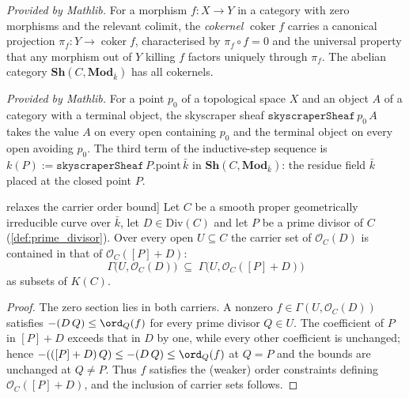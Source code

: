 \begin{definition}
  \label{def:cokernel_mathlib}
  \mathlibok
  \textit{Provided by Mathlib.}
  For a morphism \(f : X \to Y\) in a category with zero morphisms and the
  relevant colimit, the \emph{cokernel} \(\operatorname{coker} f\) carries a
  canonical projection \(\pi_f : Y \to \operatorname{coker} f\), characterised
  by \(\pi_f \circ f = 0\) and the universal property that any morphism out of
  \(Y\) killing \(f\) factors uniquely through \(\pi_f\). The abelian category
  \(\mathbf{Sh}(C, \mathbf{Mod}_{\bar k})\) has all cokernels.
\end{definition}

\begin{definition}
  \label{def:skyscraperSheaf_mathlib}
  \mathlibok
  \textit{Provided by Mathlib.}
  For a point \(p_0\) of a topological space \(X\) and an object \(A\) of a
  category with a terminal object, the skyscraper sheaf
  \(\texttt{skyscraperSheaf}\,p_0\,A\) takes the value \(A\) on every open
  containing \(p_0\) and the terminal object on every open avoiding \(p_0\).
  The third term of the inductive-step sequence is
  \(k(P) := \texttt{skyscraperSheaf}\,P.\mathrm{point}\,\bar k\) in
  \(\mathbf{Sh}(C, \mathbf{Mod}_{\bar k})\): the residue field \(\bar k\)
  placed at the closed point \(P\).
\end{definition}

\begin{lemma}

\leanok
[Adding \([P]\) relaxes the carrier order bound]
  \label{lem:carrierSet_le_add_single}
  Let \(C\) be a smooth proper geometrically irreducible curve over
  \(\bar k\), let \(D \in \mathrm{Div}(C)\) and let \(P\) be a prime divisor
  of \(C\) (\cref{def:prime_divisor}). Over every open \(U \subseteq C\) the
  carrier set of \(\mathcal O_C(D)\) is contained in that of
  \(\mathcal O_C([P]+D)\):
  \[
    \Gamma\bigl(U, \mathcal O_C(D)\bigr) \;\subseteq\;
    \Gamma\bigl(U, \mathcal O_C([P]+D)\bigr)
  \]
  as subsets of \(K(C)\).
\end{lemma}

\begin{proof}
  The zero section lies in both carriers. A nonzero
  \(f \in \Gamma(U, \mathcal O_C(D))\) satisfies \(-(D\,Q) \leq \ord_Q(f)\)
  for every prime divisor \(Q \in U\). The coefficient of \(P\) in
  \([P]+D\) exceeds that in \(D\) by one, while every other coefficient is
  unchanged; hence \(-(([P]+D)\,Q) \leq -(D\,Q) \leq \ord_Q(f)\) at \(Q = P\)
  and the bounds are unchanged at \(Q \neq P\). Thus \(f\) satisfies the
  (weaker) order constraints defining \(\mathcal O_C([P]+D)\), and the
  inclusion of carrier sets follows.
\end{proof}

